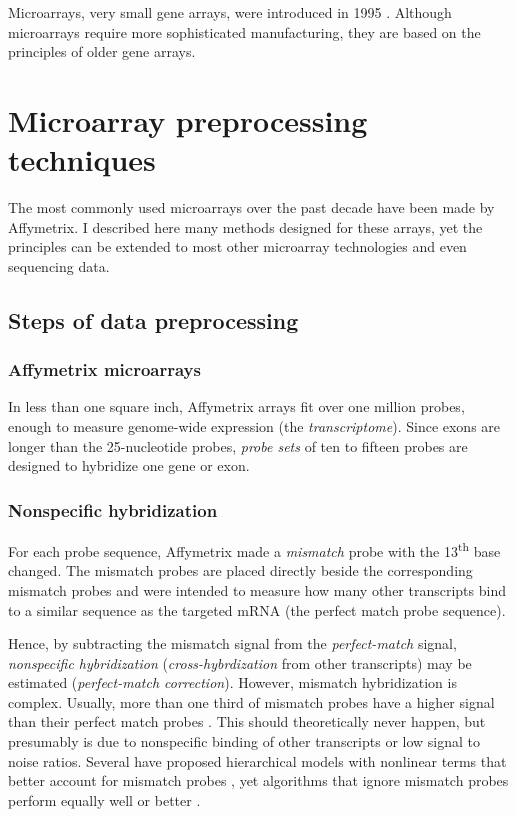 Microarrays, very small gene arrays, were introduced in 1995 \cite{Schena:1995fy}. 
Although microarrays require more sophisticated
manufacturing, they are based on the principles of older gene arrays.


\section[Microarray preprocessing]{Microarray preprocessing techniques}

The most commonly used microarrays over the past decade
have been made by Affymetrix. I described here many methods
designed for these arrays, yet the principles can be extended to
most other microarray technologies and even sequencing data.

\subsection{Steps of data preprocessing}\label{introjtm:steps}

\subsubsection{Affymetrix microarrays}

In less than one square inch, Affymetrix arrays fit over one million probes, enough
to measure genome-wide expression (the \textit{transcriptome}).
Since exons are longer than the 25-nucleotide probes,
\textit{probe sets} of ten to fifteen probes are designed to hybridize
one gene or exon.

\subsubsection{Nonspecific hybridization}

For each probe sequence, Affymetrix made a
\textit{mismatch} probe with the 13\textsuperscript{th} 
base changed. The mismatch probes are placed directly
beside the corresponding mismatch probes and were intended
to measure how many other transcripts bind to a similar
sequence as the targeted mRNA (the perfect match probe sequence).

Hence, by subtracting the mismatch signal from the \textit{perfect-match} signal,
\textit{nonspecific hybridization} (\textit{cross-hybrdization} 
from other transcripts) may be 
estimated (\textit{perfect-match correction}).
However, mismatch hybridization is complex.
Usually, more than one third of mismatch probes have a higher
signal than their perfect match probes \cite{Irizarry:2003ge}.
This should theoretically never happen, but presumably is due
to nonspecific binding of other transcripts or low signal to
noise ratios. Several have proposed
hierarchical models with nonlinear terms that
better account for mismatch probes 
\cite{Li:2001jv,Milo:2003tt,Liu:2005ey,Hein:2005ip}, yet algorithms
that ignore mismatch probes perform equally
well or better \cite{Chen:2007cr,Irizarry:2003ge,Hochreiter:2006ja}.

